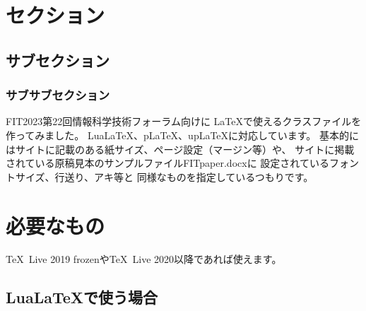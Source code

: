 \documentclass{FITpaper}
\begin{document}
\maketitle

\section{セクション}
\subsection{サブセクション}
\subsubsection{サブサブセクション}

FIT2023第22回情報科学技術フォーラム\cite{fit2023}向けに
\LaTeX で使えるクラスファイル\cite{fitpaper-class}を作ってみました。
Lua\LaTeX 、p\LaTeX 、up\LaTeX に対応しています。
基本的にはサイトに記載のある紙サイズ、ページ設定（マージン等）や、
サイトに掲載されている原稿見本のサンプルファイルFITpaper.docxに
設定されているフォントサイズ、行送り、アキ等と
同様なものを指定しているつもりです。

\section{必要なもの}

\TeX~Live 2019 frozenや\TeX~Live 2020以降であれば使えます。

\subsection{Lua\LaTeX で使う場合}
\end{document}
